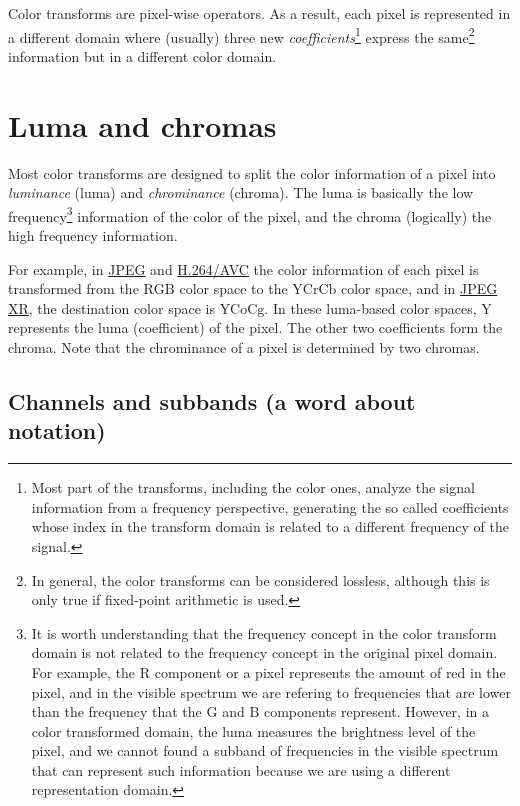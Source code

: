 Color transforms are pixel-wise operators. As a result, each pixel is
represented in a different domain where (usually) three new
\emph{coefficients}\footnote{Most part of the transforms, including
the color ones, analyze the signal information from a frequency
perspective, generating the so called coefficients whose index in the
transform domain is related to a different frequency of the signal.}
express the same\footnote{In general, the color transforms can be
considered lossless, although this is only true if fixed-point
arithmetic is used.} information but in a different color domain.

\section{Luma and chromas}

Most color transforms are designed to split the color information of a
pixel into \emph{luminance} (luma) and \emph{chrominance}
(chroma). The luma is basically the low frequency\footnote{It is worth
  understanding that the frequency concept in the color transform
  domain is not related to the frequency concept in the original pixel
  domain. For example, the $\text{R}$ component or a pixel represents
  the amount of red in the pixel, and in the visible spectrum we are
  refering to frequencies that are lower than the frequency that the
  $\text{G}$ and $\text{B}$ components represent. However, in a color
  transformed domain, the luma measures the brightness level of the
  pixel, and we cannot found a subband of frequencies in the visible
  spectrum that can represent such information because we are using a
  different representation domain.} information of the color of the
pixel, and the chroma (logically) the high frequency information.

For example, in
\href{https://en.wikipedia.org/wiki/JPEG#JPEG_codec_example}{JPEG} and
\href{https://en.wikipedia.org/wiki/Advanced_Video_Coding#Fidelity_range_extensions_and_professional_profiles}{H.264/AVC}
the color information of each pixel is transformed from the
$\text{RGB}$ color space to the $\text{YCrCb}$ color space, and in
\href{https://en.wikipedia.org/wiki/JPEG_XR#Description}{JPEG XR}, the
destination color space is $\text{YCoCg}$. In these luma-based color
spaces, $\text{Y}$ represents the luma (coefficient) of the pixel. The
other two coefficients form the chroma. Note that the chrominance of a
pixel is determined by two chromas.

\subsection*{Channels and subbands (a word about notation)}

